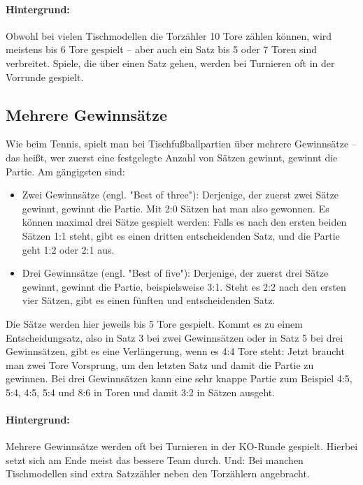 \paragraph{Hintergrund:}
Obwohl bei vielen Tischmodellen die Torzähler 10 Tore zählen können, wird meistens bis 6 Tore gespielt -- aber auch ein Satz bis 5 oder 7 Toren sind verbreitet.
Spiele, die über einen Satz gehen, werden bei Turnieren oft in der Vorrunde gespielt.


\subsection{Mehrere Gewinnsätze}
\label{spielformen:zaehlweisen:gewinnsaetze}

Wie beim Tennis, spielt man bei Tischfußballpartien über mehrere Gewinnsätze -- das heißt, wer zuerst eine festgelegte Anzahl von Sätzen gewinnt, gewinnt die Partie. Am gängigsten sind:
\begin{itemize}
\item Zwei Gewinnsätze (engl. "Best of three"): Derjenige, der zuerst zwei Sätze gewinnt, gewinnt die Partie. Mit 2:0 Sätzen hat man also gewonnen. 
Es können maximal drei Sätze gespielt werden: Falls es nach den ersten beiden Sätzen 1:1 steht, gibt es einen dritten entscheidenden Satz, und die Partie geht 1:2 oder 2:1 aus. 
\item Drei Gewinnsätze (engl. "Best of five"): Derjenige, der zuerst drei Sätze gewinnt, gewinnt die Partie, beispielsweise 3:1. Steht es 2:2 nach den ersten vier Sätzen, gibt es einen fünften und entscheidenden Satz. 
\end{itemize}
Die Sätze werden hier jeweils bis 5 Tore gespielt. Kommt es zu einem Entscheidungsatz, also in Satz 3 bei zwei Gewinnsätzen oder in Satz 5 bei drei Gewinnsätzen, gibt es eine Verlängerung, wenn es 4:4 Tore steht: Jetzt braucht man zwei Tore Vorsprung, um den letzten Satz und damit die Partie zu gewinnen. Bei drei Gewinnsätzen kann eine sehr knappe Partie zum Beispiel 4:5, 5:4, 4:5, 5:4 und 8:6 in Toren und damit 3:2 in Sätzen ausgeht. 

\paragraph{Hintergrund:}
Mehrere Gewinnsätze werden oft bei Turnieren in der KO-Runde gespielt. Hierbei setzt sich am Ende meist das bessere Team durch. 
Und: Bei manchen Tischmodellen sind extra Satzzähler neben den Torzählern angebracht. 




